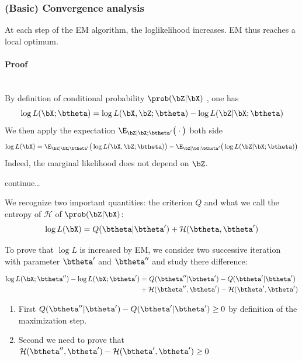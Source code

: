 \documentclass{beamer}\usepackage[]{graphicx}\usepackage[]{color}
\begin{document}
\begin{frame}[allowframebreaks]
  \frametitle{(Basic) Convergence analysis}

  \begin{theorem}
    At each step of the EM algorithm, the loglikelihood increases. EM thus reaches a local optimum.
  \end{theorem}

  \paragraph{Proof}~\\
  
    By definition of conditional probability $\prob(\bZ | \bX)$ , one has
    \begin{equation*}
      \log L(\bX;\btheta)  = \log L(\bX, \bZ;\btheta)  - \log L(\bZ | \bX;\btheta)
    \end{equation*}
    We then apply the expectation $\E_{\bZ|\bX; \btheta'}\big(\cdot \big)$ both side 
    \begin{equation*}
      \log L(\bX)  = \E_{\bZ|\bX; \btheta'}\big(\log L(\bX, \bZ; \btheta)\big)  - \E_{\bZ|\bX; \btheta'}\big(\log L(\bZ | \bX; \btheta) \big)
    \end{equation*}
    Indeed, the marginal likelihood does not depend on $\bZ$.    
    \vfill
    \begin{flushright}continue\dots\end{flushright}
    \newpage
    
    We recognize two important quantities: the criterion $Q$ and what we call the entropy of $\mathcal{H}$ of $\prob(\bZ|\bX)$:
    \begin{equation*}
      \log L(\bX)  = Q(\btheta|\btheta') + \mathcal{H}(\btheta,\btheta')
    \end{equation*}

    To prove that $\log L$ is increased by EM, we consider two successive iteration with parameter $\btheta'$ and $\btheta''$ and study there difference:

    \begin{align*}
      \log L(\bX;\btheta'') - \log L(\bX;\btheta')  & = Q(\btheta''|\btheta') - Q(\btheta'|\btheta') \\
      & + \mathcal{H}(\btheta'',\btheta') - \mathcal{H}(\btheta',\btheta')
    \end{align*}
  
    \begin{enumerate}
    \item First $Q(\btheta''|\btheta') - Q(\btheta'|\btheta') \geq 0$ by definition of the maximization step.
    \item Second we need to prove that $\mathcal{H}(\btheta'',\btheta') - \mathcal{H}(\btheta',\btheta')\geq 0$
    \end{enumerate}


\end{frame}
\end{document}
